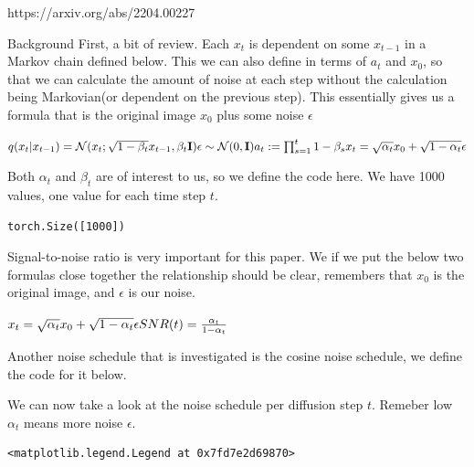 \documentclass[
  ignorenonframetext,
]{beamer}
\author{}
\date{}
\begin{document}
\ifdefined\Shaded\renewenvironment{Shaded}{\begin{tcolorbox}[borderline west={3pt}{0pt}{shadecolor}, sharp corners, enhanced, breakable, interior hidden, frame hidden, boxrule=0pt]}{\end{tcolorbox}}\fi

\begin{frame}
https://arxiv.org/abs/2204.00227
\end{frame}

\begin{frame}[fragile]{Background}
\protect\hypertarget{background}{}
First, a bit of review. Each \(x_t\) is dependent on some \(x_{t-1}\) in
a Markov chain defined below. This we can also define in terms of
\(a_t\) and \(x_0\), so that we can calculate the amount of noise at
each step without the calculation being Markovian(or dependent on the
previous step). This essentially gives us a formula that is the original
image \(x_0\) plus some noise \(\epsilon\)

\(q(x_t|x_{t-1}) = \mathcal{N}(x_t;\sqrt{1-\beta_t}x_{t-1},\beta_t\textbf{I})\\ \epsilon\sim\mathcal{N}(0,\textbf{I})\\ a_t := \prod_{s=1}^t{1-\beta_s}\\ x_t = \sqrt{\alpha_t}x_0+\sqrt{1-\alpha_t}\epsilon\)

Both \(\alpha_t\) and \(\beta_t\) are of interest to us, so we define
the code here. We have 1000 values, one value for each time step \(t\).

\begin{verbatim}
torch.Size([1000])
\end{verbatim}

Signal-to-noise ratio is very important for this paper. We if we put the
below two formulas close together the relationship should be clear,
remembers that \(x_0\) is the original image, and \(\epsilon\) is our
noise.

\(x_t = \sqrt{\alpha_t}x_0+\sqrt{1-\alpha_t}\epsilon\\ SNR(t) = \frac{\alpha_t}{1-\alpha_t}\)

Another noise schedule that is investigated is the cosine noise
schedule, we define the code for it below.

We can now take a look at the noise schedule per diffusion step \(t\).
Remeber low \(\alpha_t\) means more noise \(\epsilon\).

\begin{verbatim}
<matplotlib.legend.Legend at 0x7fd7e2d69870>
\end{verbatim}


\end{frame}
\end{document}
